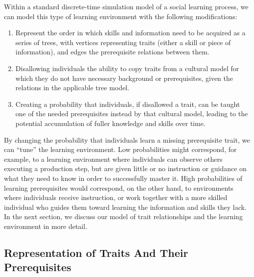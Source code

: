 Within a standard discrete-time simulation model of a social learning
process, we can model this type of learning environment with the
following modifications:

\begin{enumerate}
\def\labelenumi{\arabic{enumi}.}
\itemsep1pt\parskip0pt
\item
  Represent the order in which skills and information need to be
  acquired as a series of trees, with vertices representing traits
  (either a skill or piece of information), and edges the prerequisite
  relations between them.
\item
  Disallowing individuals the ability to copy traits from a cultural
  model for which they do not have necessary background or
  prerequisites, given the relations in the applicable tree model.
\item
  Creating a probability that individuals, if disallowed a trait, can be
  taught one of the needed prerequisites instead by that cultural model,
  leading to the potential accumulation of fuller knowledge and skills
  over time.
\end{enumerate}

By changing the probability that individuals learn a missing
prerequisite trait, we can ``tune'' the learning environment. Low
probabilities might correspond, for example, to a learning environment
where individuals can observe others executing a production step, but
are given little or no instruction or guidance on what they need to know
in order to successfully master it. High probabilities of learning
prerequisites would correspond, on the other hand, to environments where
individuals receive instruction, or work together with a more skilled
individual who guides them toward learning the information and skills
they lack. In the next section, we discuss our model of trait
relationships and the learning environment in more detail.

\subsection{Representation of Traits And Their
Prerequisites}\label{semxax:sec:representation-of-traits-and-their-prerequisites}

